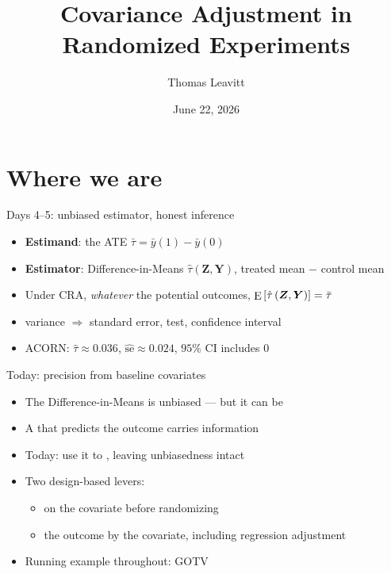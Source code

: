 \documentclass[table, xcolor = {dvipsnames}, 9pt]{beamer}
\title[Covariance adjustment]{Covariance Adjustment in Randomized Experiments}
\author{Thomas Leavitt}
\institute[]
{
\medskip
\textit{}
}
\date{June 22, 2026}
\theoremstyle{plain}
\newcommand{\mh}[1]{{\color{magenta}{#1}}}
\DeclareMathOperator{\E}{\rm{E}}
\begin{document}
\begin{frame}
\titlepage
\end{frame}

\section{Where we are}

\begin{frame}[t]{Days 4--5: unbiased estimator, honest inference}
\vfill
\begin{itemize} \vfill
\item \textbf{Estimand}: the ATE $\bar{\tau} = \bar{y}(1) - \bar{y}(0)$ \vfill
\item \textbf{Estimator}: Difference-in-Means $\hat{\tau}\left(\bm{Z}, \bm{Y}\right)$, treated mean $-$ control mean \vfill
\item Under CRA, \emph{whatever} the potential outcomes, $\E\left[\hat{\tau}\left(\bm{Z}, \bm{Y}\right)\right] = \bar{\tau}$ \vfill
\item \mh{Conservative} variance $\Rightarrow$ standard error, test, confidence interval \vfill
\item ACORN: $\hat{\tau} \approx 0.036$, $\widehat{\text{se}} \approx 0.024$, $95\%$ CI includes $0$ \vfill
\end{itemize} \vfill
\end{frame}
\begin{frame}[t]{Today: precision from baseline covariates}
\vfill
\begin{itemize} \vfill
\item The Difference-in-Means is unbiased --- but it can be \mh{noisy} \vfill
\item A \mh{baseline covariate} that predicts the outcome carries information \vfill
\item Today: use it to \mh{cut the variance}, leaving unbiasedness intact \vfill
\item Two design-based levers: \vfill
\begin{itemize} \vfill
\item \mh{block} on the covariate before randomizing \vfill
\item \mh{rescale} the outcome by the covariate, including regression adjustment \vfill
\end{itemize} \vfill
\item Running example throughout: \mh{ACORN} GOTV \citep{arceneaux2005} \vfill
\end{itemize} \vfill
\end{frame}
\end{document}
